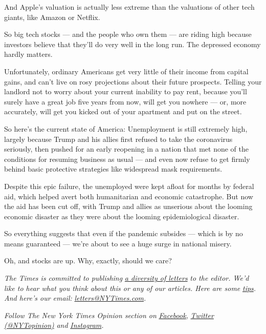 And Apple's valuation is actually less extreme than the valuations of
other tech giants, like Amazon or Netflix.

So big tech stocks --- and the people who own them --- are riding high
because investors believe that they'll do very well in the long run. The
depressed economy hardly matters.

Unfortunately, ordinary Americans get very little of their income from
capital gains, and can't live on rosy projections about their future
prospects. Telling your landlord not to worry about your current
inability to pay rent, because you'll surely have a great job five years
from now, will get you nowhere --- or, more accurately, will get you
kicked out of your apartment and put on the street.

So here's the current state of America: Unemployment is still extremely
high, largely because Trump and his allies first refused to take the
coronavirus seriously, then pushed for an early reopening in a nation
that met none of the conditions for resuming business as usual --- and
even now refuse to get firmly behind basic protective strategies like
widespread mask requirements.

Despite this epic failure, the unemployed were kept afloat for months by
federal aid, which helped avert both humanitarian and economic
catastrophe. But now the aid has been cut off, with Trump and allies as
unserious about the looming economic disaster as they were about the
looming epidemiological disaster.

So everything suggests that even if the pandemic subsides --- which is
by no means guaranteed --- we're about to see a huge surge in national
misery.

Oh, and stocks are up. Why, exactly, should we care?

\emph{The Times is committed to publishing}
\href{https://www.nytimes3xbfgragh.onion/2019/01/31/opinion/letters/letters-to-editor-new-york-times-women.html}{\emph{a
diversity of letters}} \emph{to the editor. We'd like to hear what you
think about this or any of our articles. Here are some}
\href{https://help.nytimes3xbfgragh.onion/hc/en-us/articles/115014925288-How-to-submit-a-letter-to-the-editor}{\emph{tips}}\emph{.
And here's our email:}
\href{mailto:letters@NYTimes.com}{\emph{letters@NYTimes.com}}\emph{.}

\emph{Follow The New York Times Opinion section on}
\href{https://www.facebookcorewwwi.onion/nytopinion}{\emph{Facebook}}\emph{,}
\href{http://twitter.com/NYTOpinion}{\emph{Twitter (@NYTopinion)}}
\emph{and}
\href{https://www.instagram.com/nytopinion/}{\emph{Instagram}}\emph{.}

